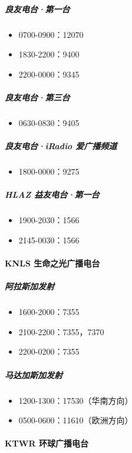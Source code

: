 \documentclass[12pt,UTF8]{ctexbook}
\begin{document}
\subparagraph{良友电台·第一台}

\begin{itemize}[leftmargin=2cm]
    \item 0700-0900：12070
    \item 1830-2200：9400
    \item 2200-0000：9345
\end{itemize}

\subparagraph{良友电台·第三台}

\begin{itemize}[leftmargin=2cm]
    \item 0630-0830：9405
\end{itemize}

\subparagraph{良友电台·iRadio 爱广播频道}

\begin{itemize}[leftmargin=2cm]
    \item 1800-0000：9275
\end{itemize}

\subparagraph{HLAZ 益友电台·第一台}

\begin{itemize}[leftmargin=2cm]
    \item 1900-2030：1566
    \item 2145-0030：1566
\end{itemize}

\paragraph{KNLS 生命之光广播电台}

\subparagraph{阿拉斯加发射}

\begin{itemize}[leftmargin=2cm]
    \item 1600-2000：7355
    \item 2100-2200：7355，7370
    \item 2200-0200：7355
\end{itemize}

\subparagraph{马达加斯加发射}

\begin{itemize}[leftmargin=2cm]
    \item 1200-1300：17530（华南方向）
    \item 0500-0600：11610（欧洲方向）
\end{itemize}

\paragraph{KTWR 环球广播电台}
\end{document}
